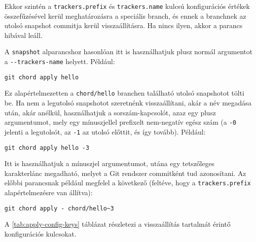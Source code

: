 \documentclass[final]{elteikthesis}[2025/03/25]
\begin{document}
Ekkor szintén a \verb|trackers.prefix| és \verb|trackers.name| kulcsú konfigurációs értékek összefűzésével
kerül meghatározásra a speciális branch,
és ennek a branchnek az utolsó snapshot commitja kerül visszaállításra.
Ha nincs ilyen, akkor a parancs hibával leáll.

A \verb|snapshot| alparancshoz hasonlóan itt is használhatjuk plusz normál argumentot a \verb|--trackers-name| helyett.
Például:

\begin{verbatim}
git chord apply hello
\end{verbatim}

Ez alapértelmezetten a \verb|chord/hello| branchen található utolsó snapshotot tölti be.
Ha nem a legutolsó snapshotot szeretnénk visszaállítani, akár a név megadása után, akár anélkül,
használhatjuk a sorszám-kapcsolót, azaz egy plusz argumentumot, mely egy mínuszjellel prefixelt nem-negatív egész szám
(a \verb|-0| jelenti a legutolsót, az \verb|-1| az utolsó előttit, és így tovább).
Például:

\begin{verbatim}
git chord apply hello -3
\end{verbatim}

Itt is használhatjuk a mínuszjel argumentumot, utána egy tetszőleges karakterlánc megadható,
melyet a Git rendszer commitként tud azonosítani.
Az előbbi parancsnak például megfelel a következő (feltéve, hogy a \verb|trackers.prefix| alapértelmezésre van állítva):

\begin{verbatim}
git chord apply - chord/hello~3
\end{verbatim}

A \ref{tab:apply-config-keys} táblázat részletezi a visszaállítás tartalmát érintő konfigurációs kulcsokat.
\end{document}
